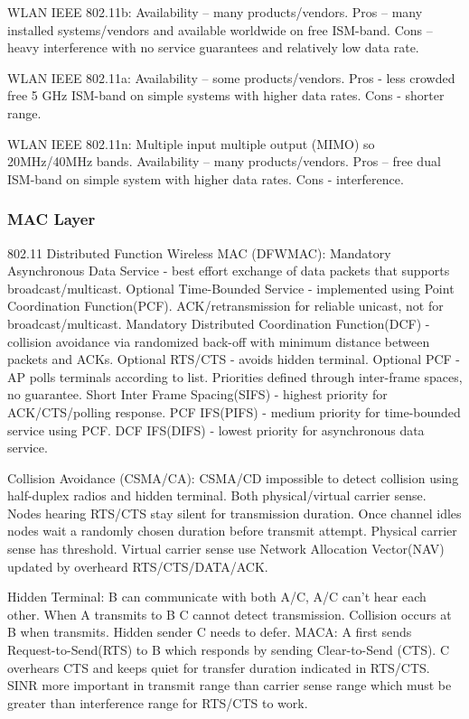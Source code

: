 \documentclass[9pt]{extarticle}
\begin{document}
\begin{multicols}{2}
WLAN IEEE 802.11b: Availability – many products/vendors. Pros – many installed systems/vendors and available worldwide on free ISM-band. Cons – heavy interference with no service guarantees and relatively low data rate.

WLAN IEEE 802.11a: Availability – some products/vendors. Pros - less crowded free 5 GHz ISM-band on simple systems with higher data rates. Cons - shorter range.

WLAN IEEE 802.11n: Multiple input multiple output (MIMO) so 20MHz/40MHz bands. Availability – many products/vendors. Pros – free dual ISM-band on simple system with higher data rates. Cons - interference.

\subsubsection{MAC Layer}

802.11 Distributed Function Wireless MAC (DFWMAC): Mandatory Asynchronous Data Service - best effort exchange of data packets  that supports broadcast/multicast. Optional Time-Bounded Service - implemented using Point Coordination Function(PCF). ACK/retransmission for reliable unicast, not for broadcast/multicast. Mandatory Distributed Coordination Function(DCF) - collision avoidance via randomized back-off with minimum distance between packets and ACKs. Optional RTS/CTS - avoids hidden terminal. Optional PCF - AP polls terminals according to list. Priorities defined through inter-frame spaces, no guarantee. Short Inter Frame Spacing(SIFS) - highest priority for ACK/CTS/polling response. PCF IFS(PIFS) - medium priority for time-bounded service using PCF. DCF IFS(DIFS) - lowest priority for asynchronous data service. 

Collision Avoidance (CSMA/CA): CSMA/CD impossible to detect collision using half-duplex radios and hidden terminal. Both physical/virtual carrier sense. Nodes hearing RTS/CTS stay silent for transmission duration. Once channel idles nodes wait a randomly chosen duration before transmit attempt. Physical carrier sense has threshold. Virtual carrier sense use Network Allocation Vector(NAV) updated by overheard
RTS/CTS/DATA/ACK.

Hidden Terminal: B can communicate with both A/C, A/C can't hear each other. When A transmits to B C cannot detect transmission. Collision occurs at B when transmits. Hidden sender C needs to defer. MACA: A first sends Request-to-Send(RTS) to B which responds by sending Clear-to-Send (CTS). C overhears CTS and keeps quiet for transfer duration indicated in RTS/CTS. SINR more important in transmit range than carrier sense range which must be greater than interference range for RTS/CTS to work.


\end{multicols}
\end{document}
